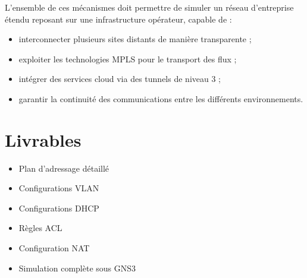 \documentclass[11pt,a4paper]{memoir}%
\begin{document}
	L’ensemble de ces mécanismes doit permettre de simuler un réseau d’entreprise étendu reposant sur une infrastructure opérateur, capable de :
	\begin{itemize}
		\item interconnecter plusieurs sites distants de manière transparente ;
		\item exploiter les technologies MPLS pour le transport des flux ;
		\item intégrer des services cloud via des tunnels de niveau 3 ;
		\item garantir la continuité des communications entre les différents environnements.
	\end{itemize}
		
	
	\chapter{Livrables}
	
	\begin{itemize}
		\item Plan d’adressage détaillé
		\item Configurations VLAN
		\item Configurations DHCP
		\item Règles ACL
		\item Configuration NAT
		\item Simulation complète sous GNS3
	\end{itemize}
	
\end{document}
